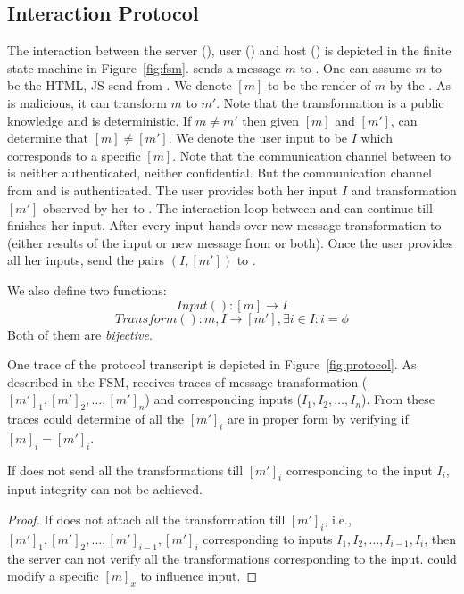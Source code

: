 \subsection{Interaction Protocol}

The interaction between the server (\server), user (\user) and host (\host) is depicted in the finite state machine in Figure~\ref{fig:fsm}. \server sends a message $m$ to \host. One can assume $m$ to be the HTML, JS send from \server. We denote $[m]$ to be the render of $m$ by the \host. As \host is malicious, it can transform $m$ to $m'$. Note that the transformation is a public knowledge and is deterministic. If $m\neq m'$ then given $[m]$ and $[m']$, \server can determine that $[m]\neq [m']$. We denote the user input to be $I$ which corresponds to a specific $[m]$. Note that the communication channel between \server to \user is neither authenticated, neither confidential. But the communication channel from \user and \server is authenticated. The user provides both her input $I$ and transformation $[m']$ observed by her to \host. The interaction loop between \host and \user can continue till \user finishes her input. After every input \host hands over new message transformation to \user (either results of the input or new message from \server or both). Once the user provides all her inputs, \host send the pairs $(I, [m'])$ to \server.

We also define two functions:
$$Input():[m]\rightarrow I$$
$$Transform():m,I\rightarrow [m'], \exists i\in I:i=\phi$$
Both of them are \emph{bijective}.

One trace of the protocol transcript is depicted in Figure~\ref{fig:protocol}. As described in the FSM, \server receives traces of message transformation ($[m']_1,[m']_2,\ldots,[m']_n$) and corresponding inputs ($I_1,I_2,\ldots,I_n$). From these traces \server could determine of all the $[m']_i$ are in proper form by verifying if $[m]_i=[m']_i$.

\begin{theorem}
\label{theorem:th1}
If \user does not send all the transformations till $[m']_i$ corresponding to the input $I_i$, input integrity can not be achieved. 
\end{theorem}

\begin{proof}
If \user does not attach all the transformation till $[m']_i$, i.e., $[m']_1, [m']_2, \ldots, [m']_{i-1}, [m']_i$  corresponding to inputs $I_1, I_2,\ldots, I_{i-1}, I_i$, then the server can not verify all the transformations corresponding to the input. \host could modify a specific $[m]_x$ to influence \user input.
\end{proof}

